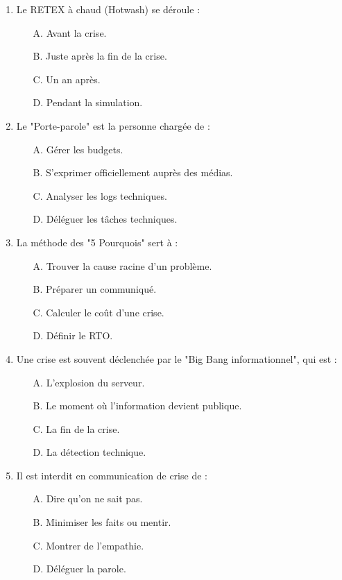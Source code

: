 \begin{enumerate}
    \item Le RETEX à chaud (Hotwash) se déroule :
    \begin{itemize}
        \item[A.] Avant la crise.
        \item[B.] Juste après la fin de la crise.
        \item[C.] Un an après.
        \item[D.] Pendant la simulation.
    \end{itemize}

    \item Le "Porte-parole" est la personne chargée de :
    \begin{itemize}
        \item[A.] Gérer les budgets.
        \item[B.] S'exprimer officiellement auprès des médias.
        \item[C.] Analyser les logs techniques.
        \item[D.] Déléguer les tâches techniques.
    \end{itemize}

    \item La méthode des "5 Pourquois" sert à :
    \begin{itemize}
        \item[A.] Trouver la cause racine d'un problème.
        \item[B.] Préparer un communiqué.
        \item[C.] Calculer le coût d'une crise.
        \item[D.] Définir le RTO.
    \end{itemize}

    \item Une crise est souvent déclenchée par le "Big Bang informationnel", qui est :
    \begin{itemize}
        \item[A.] L'explosion du serveur.
        \item[B.] Le moment où l'information devient publique.
        \item[C.] La fin de la crise.
        \item[D.] La détection technique.
    \end{itemize}

    \item Il est interdit en communication de crise de :
    \begin{itemize}
        \item[A.] Dire qu'on ne sait pas.
        \item[B.] Minimiser les faits ou mentir.
        \item[C.] Montrer de l'empathie.
        \item[D.] Déléguer la parole.
    \end{itemize}


\end{enumerate}
